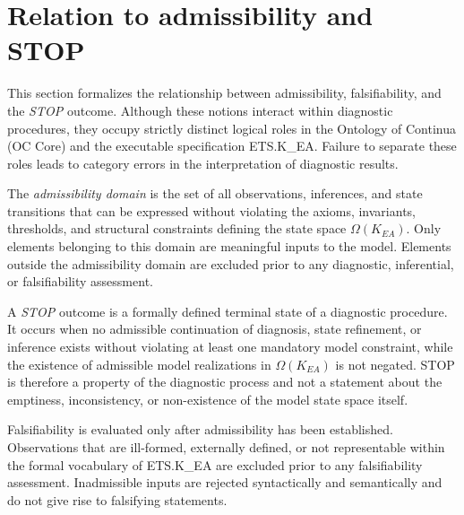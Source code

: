 ﻿\section{Relation to admissibility and STOP}
\label{sec:relation-to-stop}

This section formalizes the relationship between admissibility,
falsifiability, and the \emph{STOP} outcome.
Although these notions interact within diagnostic procedures, they occupy
strictly distinct logical roles in the Ontology of Continua (OC Core) and
the executable specification ETS.K\_EA.
Failure to separate these roles leads to category errors in the
interpretation of diagnostic results.

\medskip

\begin{definition}
The \emph{admissibility domain} is the set of all observations, inferences,
and state transitions that can be expressed without violating the axioms,
invariants, thresholds, and structural constraints defining the state space
\(\Omega(K_{EA})\).
Only elements belonging to this domain are meaningful inputs to the model.
Elements outside the admissibility domain are excluded prior to any
diagnostic, inferential, or falsifiability assessment.
\end{definition}

\medskip

\begin{remark}
A \emph{STOP} outcome is a formally defined terminal state of a diagnostic
procedure.
It occurs when no admissible continuation of diagnosis, state refinement,
or inference exists without violating at least one mandatory model
constraint, while the existence of admissible model realizations in
\(\Omega(K_{EA})\) is not negated.
STOP is therefore a property of the diagnostic process and not a statement
about the emptiness, inconsistency, or non-existence of the model state
space itself.
\end{remark}

\medskip

\begin{proposition}
Falsifiability is evaluated only after admissibility has been established.
Observations that are ill-formed, externally defined, or not representable
within the formal vocabulary of ETS.K\_EA are excluded prior to any
falsifiability assessment.
Inadmissible inputs are rejected syntactically and semantically and do not
give rise to falsifying statements.
\end{proposition}

